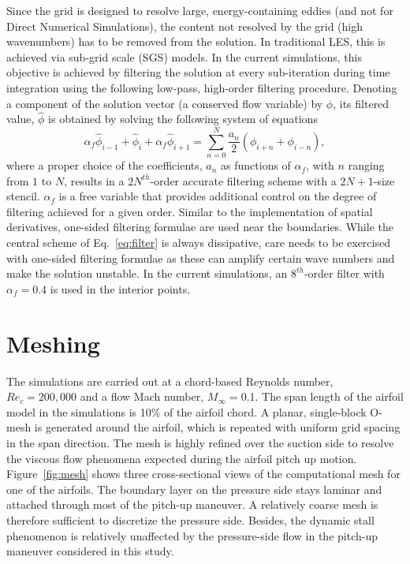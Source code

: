 \documentclass[aps,pra,preprint,groupedaddress]{revtex4-1}
\renewcommand{\=}[1]{\stackrel{#1}{=}} %
\begin{document}
Since the grid is designed to resolve large, energy-containing eddies (and not
for Direct Numerical Simulations), the content not resolved by the grid (high
wavenumbers) has to be removed from the solution. In traditional LES, this is
achieved via sub-grid scale (SGS) models. In the current simulations, this
objective is achieved by filtering the solution at every sub-iteration during
time integration using the following low-pass, high-order filtering procedure.
Denoting a component of the solution vector (a conserved flow variable) by
$\phi$, its filtered value, $\hat{\phi}$ is obtained by solving the following
system of equations
%
\begin{equation}
  \alpha_f \hat{\phi}_{i-1} + \hat{\phi}_i + \alpha_f \hat{\phi}_{i+1} 
  = \sum_{n=0}^{N} \frac{a_n}{2}\left( \phi_{i+n} + \phi_{i-n} \right),
  \label{eq:filter}
\end{equation}
%
where a proper choice of the coefficients, $a_n$ as functions of $\alpha_f$,
with $n$ ranging from $1$ to $N$, results in a $2N^{th}$-order accurate
filtering scheme with a $2N+1$-size stencil. $\alpha_f$ is a free variable that
provides additional control on the degree of filtering achieved for a given
order.  Similar to the implementation of spatial derivatives, one-sided
filtering formulae are used near the boundaries. While the central scheme of
Eq.~\ref{eq:filter} is always dissipative, care needs to be exercised with
one-sided filtering formulae as these can amplify certain wave numbers and make
the solution unstable. In the current simulations, an $8^{th}$-order filter
with $\alpha_f=0.4$ is used in the interior points.

\section{Meshing}
\label{sec:mesh}

The simulations are carried out at a chord-based Reynolds number, $Re_c =
200,000$ and a flow Mach number, $M_\infty = 0.1$. The span length of the
airfoil model in the simulations is 10\% of the airfoil chord.
A planar, single-block O-mesh is generated around the airfoil, which is
repeated with uniform grid spacing in the span direction. The mesh is highly
refined over the suction side to resolve the viscous flow phenomena expected
during the airfoil pitch up motion.  Figure~\ref{fig:mesh} shows three
cross-sectional views of the computational mesh for one of the airfoils. The
boundary layer on the pressure side stays laminar and attached through most of
the pitch-up maneuver. A relatively coarse mesh is therefore sufficient to
discretize the pressure side. Besides, the dynamic stall phenomenon is
relatively unaffected by the pressure-side flow in the pitch-up maneuver
considered in this study.
\end{document}
